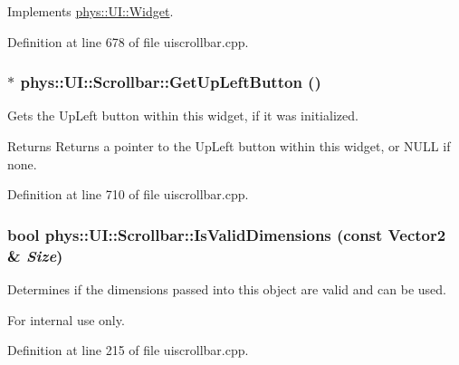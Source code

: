 Implements \hyperlink{classphys_1_1UI_1_1Widget_a07039c19e57de314147ce066417da0a2}{phys::UI::Widget}.



Definition at line 678 of file uiscrollbar.cpp.

\hypertarget{classphys_1_1UI_1_1Scrollbar_ab298f9747da2eed451ddce8b1a416c15}{
\subsubsection[{GetUpLeftButton}]{ $\ast$ phys::UI::Scrollbar::GetUpLeftButton ()}}
\label{d0/d3e/classphys_1_1UI_1_1Scrollbar_ab298f9747da2eed451ddce8b1a416c15}


Gets the UpLeft button within this widget, if it was initialized. 

\begin{DoxyReturn}{Returns}
Returns a pointer to the UpLeft button within this widget, or NULL if none. 
\end{DoxyReturn}


Definition at line 710 of file uiscrollbar.cpp.

\hypertarget{classphys_1_1UI_1_1Scrollbar_a4953ac8c0b711ed9c1be468897e09ce8}{
\subsubsection[{IsValidDimensions}]{\setlength{\rightskip}{0pt plus 5cm}bool phys::UI::Scrollbar::IsValidDimensions (const {\bf Vector2} \& {\em Size})}}
\label{d0/d3e/classphys_1_1UI_1_1Scrollbar_a4953ac8c0b711ed9c1be468897e09ce8}


Determines if the dimensions passed into this object are valid and can be used. 

\begin{DoxyInternal}{For internal use only.}
\end{DoxyInternal}


Definition at line 215 of file uiscrollbar.cpp.

